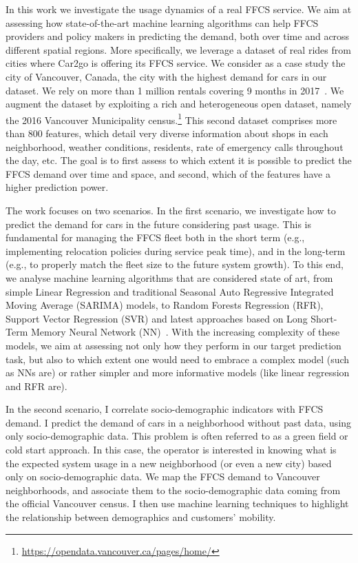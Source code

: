 In this work we investigate the usage dynamics of a real FFCS service. We aim at assessing how state-of-the-art machine learning algorithms can help FFCS providers and policy makers in predicting the demand, both over time and across different spatial regions.
More specifically, we leverage a dataset of real rides from cities where Car2go is offering its FFCS service. We consider as a case study the city of Vancouver, Canada, the city with the highest demand for cars in our dataset. We rely on more than 1 million rentals covering 9 months in 2017~\citep{ciociolaumap}.
We augment the dataset by exploiting a rich and heterogeneous open dataset, namely the 2016 Vancouver Municipality census.\footnote{\url{https://opendata.vancouver.ca/pages/home/}} 
This second dataset comprises more than 800 features, which detail very diverse information about shops in each neighborhood, weather conditions, residents, rate of emergency calls throughout the day, etc. The goal is to first assess to which extent it is possible to predict the FFCS demand over time and space, and second, which of the features have a higher prediction power.

The work focuses on two scenarios.
In the first scenario, we investigate how to predict the demand for cars in the future considering past usage.  This is fundamental for managing the FFCS fleet both in the short term (e.g., implementing relocation policies during service peak time), and in the long-term (e.g., to properly match the fleet size to the future system growth).
To this end, we analyse machine learning algorithms that are considered state of art, from simple Linear Regression and traditional Seasonal Auto Regressive Integrated Moving Average (SARIMA) models, to Random Forests Regression (RFR), Support Vector Regression (SVR) and latest approaches based on Long Short-Term Memory Neural Network (NN)~\citep{brockwell2016introduction,Bishop:2006}. With the increasing complexity of these models, we aim at assessing not only how they perform in our target prediction task, but also to which extent one would need to embrace a complex model (such as NNs are) or rather simpler and more informative models (like linear regression and RFR are).


In the second scenario, I correlate socio-demographic indicators with FFCS demand. 
I predict the demand of cars in a neighborhood without past data, using only socio-demographic data. 
This problem is often referred to as a green field or cold start approach. In this case, the operator is interested in knowing what is the expected system usage in a new neighborhood (or even a new city) based only on socio-demographic data. 
We map the FFCS demand to Vancouver neighborhoods, and associate them to the socio-demographic data coming from the official Vancouver census. I then use machine learning techniques to highlight the relationship between demographics and customers' mobility.  

